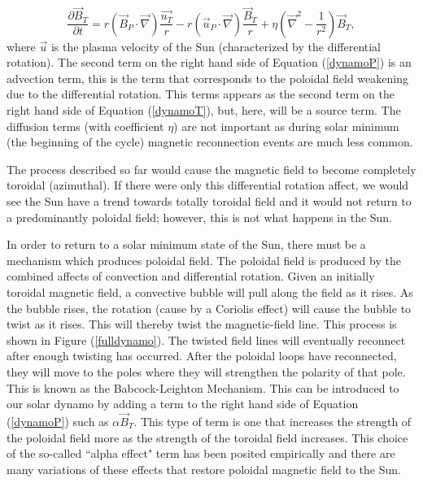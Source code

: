 \documentclass[%
 reprint,
 amsmath,amssymb,
 aps,
]{revtex4-1}
\begin{document}
\begin{equation} \label{dynamoT}
\frac{\partial \vec{B} _{T}}{\partial t} = r (\vec{B} _P \cdot \vec{\nabla})\frac{\vec{u _T}}{r} - r ( \vec{u} _P \cdot \vec{\nabla}) \frac{\vec{B} _T}{r} + \eta (\vec{\nabla} ^2 - \frac{1}{r^2} ) \vec{B} _T,
\end{equation}
where $\vec{u}$ is the plasma velocity of the Sun (characterized by the differential rotation). The second term on the right hand side of Equation (\ref{dynamoP}) is an advection term, this is the term that corresponds to the poloidal field weakening due to the differential rotation. This terms appears as the second term on the right hand side of Equation (\ref{dynamoT}), but, here, will be a source term. The diffusion terms (with coefficient $\eta$) are not important as during solar minimum (the beginning of the cycle) magnetic reconnection events are much less common.  

The process described so far would cause the magnetic field to become completely toroidal (azimuthal). If there were only this differential rotation affect, we would see the Sun have a trend towards totally toroidal field and it would not return to a predominantly poloidal field; however, this is not what happens in the Sun.

In order to return to a solar minimum state of the Sun, there must be a mechanism which produces poloidal field. The poloidal field is produced by the combined affects of convection and differential rotation. Given an initially toroidal magnetic field, a convective bubble will pull along the field as it rises. As the bubble rises, the rotation (cause by a Coriolis effect) will cause the bubble to twist as it rises. This will thereby twist the magnetic-field line. This process is shown in Figure (\ref{fulldynamo}). The twisted field lines will eventually reconnect after enough twisting has occurred. After the poloidal loops have reconnected, they will move to the poles where they will strengthen the polarity of that pole. This is known as the Babcock-Leighton Mechanism. This can be introduced to our solar dynamo by adding a term to the right hand side of Equation (\ref{dynamoP}) such as $\alpha \vec{B} _T$. This type of term is one that increases the strength of the poloidal field more as the strength of the toroidal field increases. This choice of the so-called ``alpha effect" term has been posited empirically and there are many variations of these effects that restore poloidal magnetic field to the Sun. 

\end{document}
